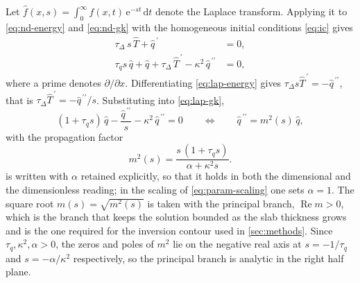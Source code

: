 \documentclass[preprint,12pt,a4paper]{elsarticle}
\theoremstyle{plain}
\theoremstyle{definition}
\theoremstyle{remark}
\newcommand{\tq}{\tau_{q}}
\newcommand{\kk}{\kappa^{2}}
\begin{document}
Let $\hat{f}(x,s) = \int_{0}^{\infty} f(x,t)\,\mathrm{e}^{-st}\,\mathrm{d}t$
denote the Laplace transform. Applying it to \eqref{eq:nd-energy} and
\eqref{eq:nd-gk} with the homogeneous initial conditions \eqref{eq:ic} gives
%
\begin{align}
  \tau_{\Delta}\, s\, \hat{T} + \hat{q}^{\,\prime} &= 0 ,
  \label{eq:lap-energy} \\[0.5ex]
  \tq s\, \hat{q} + \hat{q}
    + \tau_{\Delta}\, \hat{T}^{\,\prime}
    - \kk \, \hat{q}^{\,\prime\prime} &= 0 ,
  \label{eq:lap-gk}
\end{align}
%
where a prime denotes $\partial/\partial x$. Differentiating
\eqref{eq:lap-energy} gives
$\tau_{\Delta} s \hat{T}^{\,\prime} = -\hat{q}^{\,\prime\prime}$, that is
$\tau_{\Delta}\hat{T}^{\,\prime} = -\hat{q}^{\,\prime\prime}/s$. Substituting
into \eqref{eq:lap-gk},
%
\begin{equation}
  (1 + \tq s)\,\hat{q}
  - \frac{\hat{q}^{\,\prime\prime}}{s}
  - \kk\, \hat{q}^{\,\prime\prime} = 0
  \qquad\Longleftrightarrow\qquad
  \hat{q}^{\,\prime\prime} = m^{2}(s)\, \hat{q} ,
  \label{eq:helmholtz}
\end{equation}
%
with the propagation factor
%
\begin{equation}
  m^{2}(s) = \frac{s\,(1 + \tq s)}{\alpha + \kk s} .
  \label{eq:m2}
\end{equation}
%
 is written with $\alpha$ retained explicitly, so that it holds in
both the dimensional and the dimensionless reading; in the scaling of
\eqref{eq:param-scaling} one sets $\alpha = 1$. The square root
$m(s) = \sqrt{m^{2}(s)}$ is taken with the principal branch,
$\operatorname{Re} m > 0$, which is the branch that keeps the solution bounded
as the slab thickness grows and is the one required for the inversion contour
used in \cref{sec:methods}. Since $\tq, \kk, \alpha > 0$, the zeros and poles
of $m^{2}$ lie on the negative real axis at $s = -1/\tq$ and $s = -\alpha/\kk$
respectively, so the principal branch is analytic in the right half plane.
\end{document}

